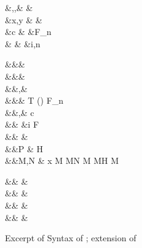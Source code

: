 \documentclass[screen,nonacm,manuscript,review]{acmart} %
\begin{document}
 \begin{figure}[h]
 \begin{syntax}
  &\TyVar,\beta,\Co &\qquad{} &\TypeConst \\
  &x,y &\qquad{} &\NType \\
  &c &\qquad{} &F_n\\
                      &  &\qquad{} &i,n \in {}\\
 \end{syntax}
 \begin{syntax}
    &&\rho \bnfeq& \\
    &&\kappa \bnfeq& \star \bnfor \kappa \to \kappa \bnfor \shl{\sigma \sim_\rho \tau}\\
    &&\tau,\sigma \bnfeq& \TyVar \bnfor {} \bnfor
   \tau\App\tau \bnfor \Forall {\TyVar\co\kappa} \tau \bnfor \Co \\
     &&\TypeConst \bnfeq& T \bnfor (\to) \bnfor \NType \bnfor
   F_n\many\tau\\
  &&\nu,\Co \bnfeq& c \bnfor \Refl\tau \bnfor \Sym\Co \bnfor \Trans\nu\Co %
 \bnfor \Forall {\TyVar\co\kappa} \Co \bnfor \Co\At\tau %
 \bnfor \nu\App\Co \\
                  &&              &\bnfor \Left \Co \bnfor \Right \Co \bnfor \Nth i \Co \bnfor \TypeConst\App\many\Co \bnfor F\many\Co \bnfor \shl{\SubCo \Co} \\  %
  && \phi \bnfeq& \tau \bnfor \Co\\
  &&P \bnfeq& H\App \many{\beta\co\kappa} \\
  &&M,N \bnfeq& x \bnfor {} M \bnfor M\App N \bnfor \TLam{\tau\co\kappa} M \bnfor M\App\phi \bnfor H \bnfor \Case M  \bnfor \Cast \Tm \Co
 \end{syntax}
 \begin{syntax}

                     &&\roles{\TypeConst} \bnfeq& \List{\rho \mid \alpha\co\rho, \alpha\in\Params{\TypeConst}}\\
                     && \bnfeq& \\
                     &&\Params{\NType} \bnfeq& \List{\alpha  \mid \NType\App\many\alpha \co \star}\\
                     && \bnfeq& 
 \end{syntax}
 \caption{Excerpt of Syntax of \SFR; extension of \SFC}
 \label{fig:sfr-syntax}
 \end{figure}
\end{document}
